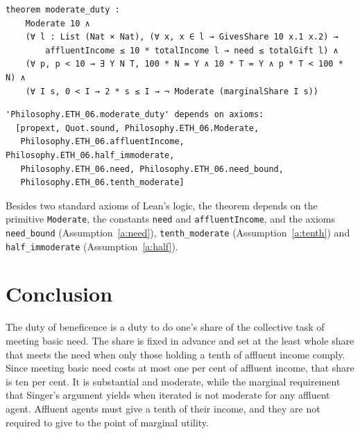 \documentclass{situationist-preprint}
\begin{document}
\begin{lstlisting}
theorem moderate_duty :
    Moderate 10 ∧
    (∀ l : List (Nat × Nat), (∀ x, x ∈ l → GivesShare 10 x.1 x.2) →
        affluentIncome ≤ 10 * totalIncome l → need ≤ totalGift l) ∧
    (∀ p, p < 10 → ∃ Y N T, 100 * N = Y ∧ 10 * T = Y ∧ p * T < 100 * N) ∧
    (∀ I s, 0 < I → 2 * s ≤ I → ¬ Moderate (marginalShare I s))
\end{lstlisting}

\begin{lstlisting}
'Philosophy.ETH_06.moderate_duty' depends on axioms:
  [propext, Quot.sound, Philosophy.ETH_06.Moderate,
   Philosophy.ETH_06.affluentIncome, Philosophy.ETH_06.half_immoderate,
   Philosophy.ETH_06.need, Philosophy.ETH_06.need_bound,
   Philosophy.ETH_06.tenth_moderate]
\end{lstlisting}

Besides two standard axioms of Lean's logic, the theorem depends on the primitive \texttt{Moderate}, the constants \texttt{need} and \texttt{affluentIncome}, and the axioms \texttt{need\_bound} (Assumption~\ref{a:need}), \texttt{tenth\_moderate} (Assumption~\ref{a:tenth}) and \texttt{half\_immoderate} (Assumption~\ref{a:half}).

\section{Conclusion}

The duty of beneficence is a duty to do one's share of the collective task of meeting basic need. The share is fixed in advance and set at the least whole share that meets the need when only those holding a tenth of affluent income comply. Since meeting basic need costs at most one per cent of affluent income, that share is ten per cent. It is substantial and moderate, while the marginal requirement that Singer's argument yields when iterated is not moderate for any affluent agent. Affluent agents must give a tenth of their income, and they are not required to give to the point of marginal utility.
\end{document}

